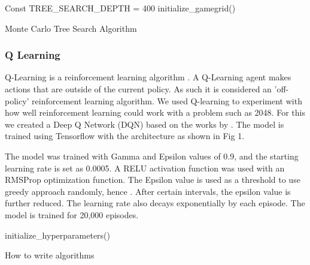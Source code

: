 \documentclass{svproc}
\begin{document}
    \begin{algorithm}[H]
        \SetAlgoLined
        Const TREE\_SEARCH\_DEPTH = 400\;
        initialize\_gamegrid()\;
        \caption{Monte Carlo Tree Search Algorithm}
    \end{algorithm}


    \subsubsection{Q Learning}
    Q-Learning is a reinforcement learning algorithm \cite{watkins1992q}. A Q-Learning agent makes actions that are outside of the current policy. As such it is considered an 'off-policy' reinforcement learning algorithm. We used Q-learning to experiment with how well reinforcement learning could work with a problem such as 2048. For this we created a Deep Q Network (DQN) based on the works by \cite{dqnGit}. The model is trained using Tensorflow with the architecture as shown in Fig 1.

    The model was trained with Gamma and Epsilon values of 0.9, and the starting learning rate is set as 0.0005. A RELU activation function was used with an RMSProp optimization function. The Epsilon value is used as a threshold to use greedy approach randomly, hence . After certain intervals, the epsilon value is further reduced. The learning rate also decays exponentially by each episode. The model is trained for 20,000 episodes.

    \begin{algorithm}[H]
        \SetAlgoLined
        initialize_hyperparameters()

        \caption{How to write algorithms}
    \end{algorithm}
\end{document}
